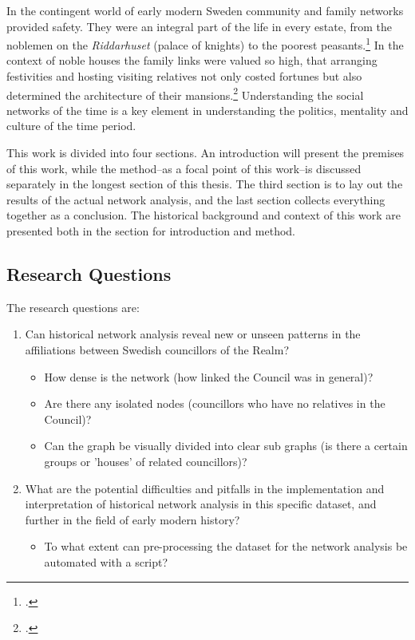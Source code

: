 In the contingent world of early modern Sweden community and family networks provided safety. They were an integral part of the life in every estate, from the noblemen on the \textit{Riddarhuset} (palace of knights) to the poorest peasants.\footcite[pp. 27-28.]{hopesAndFearsIntro} In the context of noble houses the family links were valued so high, that arranging festivities and hosting visiting relatives not only costed fortunes but also determined the architecture of their mansions.\footcite[pp. 185-189.]{hakanenAndKoskinen2020} Understanding the social networks of the time is a key element in understanding the politics, mentality and culture of the time period.  

This work is divided into four sections. An introduction will present the premises of this work, while the method–as a focal point of this work–is discussed separately in the longest section of this thesis. The third section is to lay out the results of the actual network analysis, and the last section collects everything together as a conclusion. The historical background and context of this work are presented both in the section for introduction and method. 

\subsection{Research Questions}
The research questions are:
\begin{enumerate}
	\item Can historical network analysis reveal new or unseen patterns in the affiliations between Swedish councillors of the Realm? \begin{itemize}
		\item How dense is the network (how linked the Council was in general)?
		\item Are there any isolated nodes (councillors who have no relatives in the Council)?
		\item Can the graph be visually divided into clear sub graphs (is there a certain groups or 'houses' of related councillors)?
	\end{itemize}	
	\item What are the potential difficulties and pitfalls in the implementation and interpretation of historical network analysis in this specific dataset, and further in the field of early modern history? \begin{itemize}	
		\item To what extent can pre-processing the dataset for the network analysis be automated with a script?
	\end{itemize}
\end{enumerate} 

